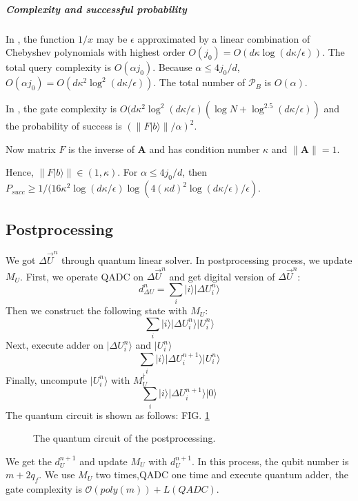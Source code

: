 \documentclass[%
 reprint,
 amsmath,amssymb,
pra,
]{revtex4-1}
\begin{document}
\subparagraph{Complexity and successful probability}
In \cite{Childs2017Quantum}, the function $1/x$ may be $\epsilon$ approximated by a linear combination of Chebyshev polynomials with highest order $O(j_0)=O(d\kappa \log(d\kappa/\epsilon))$. The total query complexity is $O(\alpha j_0)$. Because $\alpha\leqslant 4j_0/d$, $O(\alpha j_0)=O(d\kappa^2\log^2(d\kappa/\epsilon))$. The total number of $\mathcal{P}_B$ is $O(\alpha)$.

In \cite{berry2015hamiltonian}, the gate complexity is $O(d\kappa^2\log^2(d\kappa/\epsilon) (\log N+\log^{2.5}(d\kappa/\epsilon))$ and the probability of success is $(\lVert F|b\rangle\rVert/\alpha)^2$. 

Now matrix $F$ is the inverse of $\bm{A}$ and has condition number $\kappa$ and $\lVert \bm{A}\rVert=1$. 

Hence, $\lVert F|b\rangle\rVert\in (1, \kappa)$. For $\alpha\leqslant4j_0/d$, then $P_{succ}\geqslant 1/(16\kappa^2 \log(d\kappa/\epsilon) \log(4(\kappa d)^2\log(d \kappa/\epsilon)/\epsilon)$.

\subsection{Postprocessing}

We got $\Delta \vec{U}^n$ through quantum linear solver. In postprocessing process, we update $M_U$. First, we operate QADC on $\Delta \vec{U}^n$ and get digital version of $\Delta \vec{U}^n$:
\begin{equation}
d_{\Delta U}^n=\sum_i{|i\rangle|\Delta U_i^n\rangle}
\end{equation}
Then we construct the following state with $M_U$:
\begin{equation}
\sum_i{|i\rangle|\Delta U_i^n\rangle|U_i^n\rangle}
\end{equation}
Next, execute adder on $|\Delta U_i^n\rangle$ and $|U_i^n\rangle$
\begin{equation}
\sum_i{|i\rangle|\Delta U_i^{n+1}\rangle|U_i^n\rangle}
\end{equation}
Finally, uncompute $|U_i^n\rangle$ with $M_U^{\dagger}$
\begin{equation}
\sum_i{|i\rangle|\Delta U_i^{n+1}\rangle|0\rangle}
\end{equation}
The quantum circuit is shown as follows: FIG. \ref{postprocessing_qcir}
\begin{figure}[htbp]
	 \caption{The quantum circuit of the postprocessing.}
	\label{postprocessing_qcir}
   \end{figure}
We get the $d_U^{n+1}$ and update $M_U$ with $d_U^{n+1}$. In this process, the qubit number is $m+2q_f$. We use $M_U$ two times,QADC one time and execute quantum adder, the gate complexity is $\mathcal{O}(poly(m))+L(QADC)$.
\end{document}
